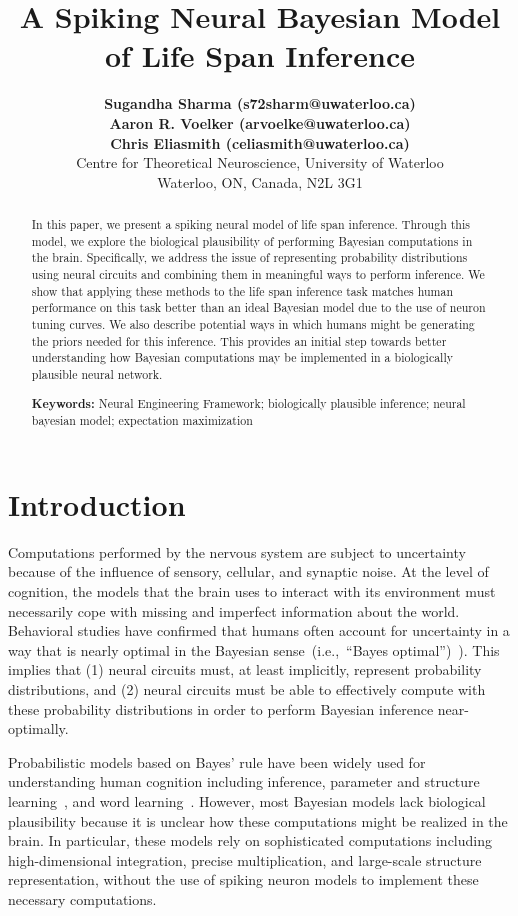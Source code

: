 \documentclass[10pt,letterpaper]{article}
\title{A Spiking Neural Bayesian Model of Life Span Inference}
\author{{\large \bf Sugandha Sharma (s72sharm@uwaterloo.ca)} \\
  {\large \bf Aaron R. Voelker (arvoelke@uwaterloo.ca)} \\
  {\large \bf Chris Eliasmith (celiasmith@uwaterloo.ca)} \\
  Centre for Theoretical Neuroscience, University of Waterloo \\
  Waterloo, ON, Canada, N2L 3G1}
\begin{document}
\maketitle

\begin{abstract}
In this paper, we present a spiking neural model of life span inference. Through this model, we explore the biological plausibility of performing Bayesian computations in the brain. Specifically, we address the issue of representing probability distributions using neural circuits and combining them in meaningful ways to perform inference.  We show that applying these methods to the life span inference task matches human performance on this task better than an ideal Bayesian model due to the use of neuron tuning curves.  We also describe potential ways in which humans might be generating the priors needed for this inference. This provides an initial step towards better understanding how Bayesian computations may be implemented in a biologically plausible neural network. 

\textbf{Keywords:} 
Neural Engineering Framework; biologically plausible inference; neural bayesian model; expectation maximization 
\end{abstract}

\section{Introduction}

Computations performed by the nervous system are subject to uncertainty because of the influence of sensory, cellular, and synaptic noise. At the level of cognition, the models that the brain uses to interact with its environment must necessarily cope with missing and imperfect information about the world. Behavioral studies have confirmed that humans often account for uncertainty in a way that is nearly optimal in the Bayesian sense~(i.e.,~``Bayes optimal'')~\cite{ma2006bayesian}). This implies that (1) neural circuits must, at least implicitly, represent probability distributions, and (2) neural circuits must be able to effectively compute with these probability distributions in order to perform Bayesian inference near-optimally. 

Probabilistic models based on Bayes' rule have been widely used for understanding human cognition including inference, parameter and structure learning~\cite{jacobs2011bayesian}, and word learning~\cite{xu2007word}. However, most Bayesian models lack biological plausibility because it is unclear how these computations might be realized in the brain. In particular, these models rely on sophisticated computations including high-dimensional integration, precise multiplication, and large-scale structure representation, without the use of spiking neuron models to implement these necessary computations.
\end{document}
